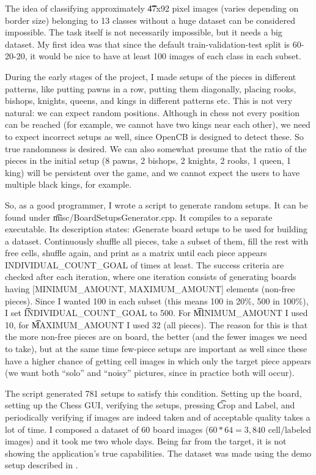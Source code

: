 The idea of classifying approximately \t{47x92} pixel images (varies depending on border size) belonging to 13 classes without a huge dataset can be considered impossible. The task itself is not necessarily impossible, but it needs a big dataset. My first idea was that since the default train-validation-test split is 60-20-20, it would be nice to have at least 100 images of each class in each subset.

During the early stages of the project, I made setups of the pieces in different patterns, like putting pawns in a row, putting them diagonally, placing rooks, bishops, knights, queens, and kings in different patterns etc. This is not very natural: we can expect random positions. Although in chess not every position can be reached (for example, we cannot have two kings near each other), we need to expect incorrect setups as well, since OpenCB is designed to detect these. So true randomness is desired. We can also somewhat presume that the ratio of the pieces in the initial setup (8 pawns, 2 bishops, 2 knights, 2 rooks, 1 queen, 1 king) will be persistent over the game, and we cannot expect the users to have multiple black kings, for example.

So, as a good programmer, I wrote a script to generate random setups. It can be found under \t{misc/BoardSetupsGenerator.cpp}. It compiles to a separate executable. Its description states: \i{Generate board setups to be used for building a dataset. Continuously shuffle all pieces, take a subset of them, fill the rest with free cells, shuffle again, and print as a matrix until each piece appears INDIVIDUAL\_COUNT\_GOAL of times at least. The success criteria are checked after each iteration, where one iteration consists of generating boards having [MINIMUM\_AMOUNT, MAXIMUM\_AMOUNT] elements (non-free pieces)}. Since I wanted 100 in each subset (this means 100 in 20\%, 500 in 100\%), I set \t{INDIVIDUAL\_COUNT\_GOAL} to 500. For \t{MINIMUM\_AMOUNT} I used 10, for \t{MAXIMUM\_AMOUNT} I used 32 (all pieces). The reason for this is that the more non-free pieces are on board, the better (and the fewer images we need to take), but at the same time few-piece setups are important as well since these have a higher chance of getting cell images in which only the target piece appears (we want both ``solo'' and ``noisy'' pictures, since in practice both will occur).

The script generated 781 setups to satisfy this condition. Setting up the board, setting up the Chess GUI, verifying the setups, pressing \t{Crop and Label}, and periodically verifying if images are indeed taken and of acceptable quality takes a lot of time. I composed a dataset of 60 board images ($60 * 64 = 3,840$ cell/labeled images) and it took me two whole days. Being far from the target, it is not showing the application's true capabilities. The dataset was made using the demo setup described in .



